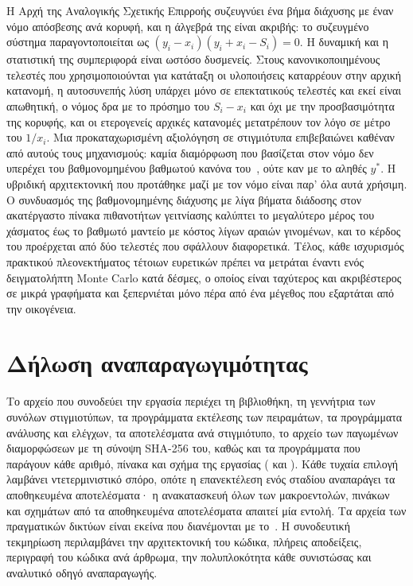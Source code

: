 \documentclass[11pt,a4paper]{article}
\theoremstyle{definition}
\theoremstyle{plain}
\begin{document}
Η Αρχή της Αναλογικής Σχετικής Επιρροής συζευγνύει ένα βήμα διάχυσης με έναν νόμο απόσβεσης ανά κορυφή, και η άλγεβρά της είναι ακριβής: το συζευγμένο σύστημα παραγοντοποιείται ως $(y_i-x_i)(y_i+x_i-S_i)=0$. Η δυναμική και η στατιστική της συμπεριφορά είναι ωστόσο δυσμενείς. Στους κανονικοποιημένους τελεστές που χρησιμοποιούνται για κατάταξη οι υλοποιήσεις καταρρέουν στην αρχική κατανομή, η αυτοσυνεπής λύση υπάρχει μόνο σε επεκτατικούς τελεστές και εκεί είναι απωθητική, ο νόμος δρα με το πρόσημο του $S_i-x_i$ και όχι με την προσβασιμότητα της κορυφής, και οι ετερογενείς αρχικές κατανομές μετατρέπουν τον λόγο σε μέτρο του $1/x_i$. Μια προκαταχωρισμένη αξιολόγηση σε \NTotal{} στιγμιότυπα επιβεβαιώνει καθέναν από αυτούς τους μηχανισμούς: καμία διαμόρφωση που βασίζεται στον νόμο δεν υπερέχει του βαθμονομημένου βαθμωτού κανόνα του~\cite{konstantellos26}, ούτε καν με το αληθές $y^*$. Η υβριδική αρχιτεκτονική που προτάθηκε μαζί με τον νόμο είναι παρ' όλα αυτά χρήσιμη. Ο συνδυασμός της βαθμονομημένης διάχυσης με λίγα βήματα διάδοσης στον ακατέργαστο πίνακα πιθανοτήτων γειτνίασης καλύπτει το μεγαλύτερο μέρος του χάσματος έως το βαθμωτό μαντείο με κόστος λίγων αραιών γινομένων, και το κέρδος του προέρχεται από δύο τελεστές που σφάλλουν διαφορετικά. Τέλος, κάθε ισχυρισμός πρακτικού πλεονεκτήματος τέτοιων ευρετικών πρέπει να μετράται έναντι ενός δειγματολήπτη Monte Carlo κατά δέσμες, ο οποίος είναι ταχύτερος και ακριβέστερος σε μικρά γραφήματα και ξεπερνιέται μόνο πέρα από ένα μέγεθος που εξαρτάται από την οικογένεια.

\section*{Δήλωση αναπαραγωγιμότητας}

Το αρχείο που συνοδεύει την εργασία περιέχει τη βιβλιοθήκη, τη γεννήτρια των συνόλων στιγμιοτύπων, τα προγράμματα εκτέλεσης των πειραμάτων, τα προγράμματα ανάλυσης και ελέγχων, τα αποτελέσματα ανά στιγμιότυπο, το αρχείο των παγωμένων διαμορφώσεων με τη σύνοψη SHA-256 του, καθώς και τα προγράμματα που παράγουν κάθε αριθμό, πίνακα και σχήμα της εργασίας ( και ). Κάθε τυχαία επιλογή λαμβάνει ντετερμινιστικό σπόρο, οπότε η επανεκτέλεση ενός σταδίου αναπαράγει τα αποθηκευμένα αποτελέσματα· η ανακατασκευή όλων των μακροεντολών, πινάκων και σχημάτων από τα αποθηκευμένα αποτελέσματα απαιτεί μία εντολή. Τα αρχεία των πραγματικών δικτύων είναι εκείνα που διανέμονται με το~\cite{shchur18}. Η συνοδευτική τεκμηρίωση περιλαμβάνει την αρχιτεκτονική του κώδικα, πλήρεις αποδείξεις, περιγραφή του κώδικα ανά άρθρωμα, την πολυπλοκότητα κάθε συνιστώσας και αναλυτικό οδηγό αναπαραγωγής.
\end{document}
